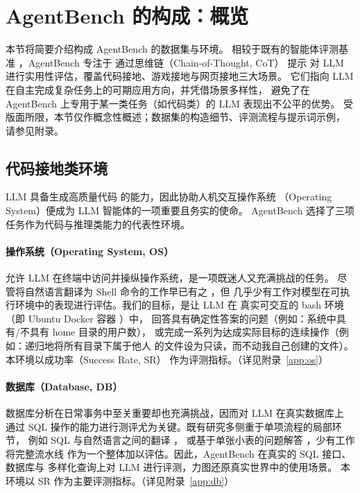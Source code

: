 
\section{AgentBench 的构成：概览}

本节将简要介绍构成 AgentBench 的数据集与环境。
相较于既有的智能体评测基准 \citep{cote2019,fan2022}，AgentBench 专注于
通过思维链（Chain-of-Thought, CoT）\citep{wei2022b,yao2023b} 提示
对 LLM 进行实用性评估，覆盖代码接地、游戏接地与网页接地三大场景。
它们指向 LLM 在自主完成复杂任务上的可期应用方向，并凭借场景多样性，
避免了在 AgentBench 上专用于某一类任务（如代码类）的 LLM 表现出不公平的优势。
受版面所限，本节仅作概念性概述；数据集的构造细节、评测流程与提示词示例，
请参见附录。

\subsection{代码接地类环境}

LLM 具备生成高质量代码 \citep{chen2021} 的能力，因此协助人机交互操作系统
（Operating System）便成为 LLM 智能体的一项重要且务实的使命。
AgentBench 选择了三项任务作为代码与推理类能力的代表性环境。

\paragraph{操作系统（Operating System, OS）}
允许 LLM 在终端中访问并操纵操作系统，是一项既迷人又充满挑战的任务。
尽管将自然语言翻译为 Shell 命令的工作早已有之 \citep{lin2018}，但
几乎少有工作对模型在可执行环境中的表现进行评估。我们的目标，是让 LLM 在
真实可交互的 bash 环境（即 Ubuntu Docker 容器 \citep{merkel2014}）中，
回答具有确定性答案的问题（例如：系统中具有/不具有 home 目录的用户数），
或完成一系列为达成实际目标的连续操作（例如：递归地将所有目录下属于他人
的文件设为只读，而不动我自己创建的文件）。本环境以成功率（Success Rate, SR）
作为评测指标。（详见附录~\ref{app:os}）

\paragraph{数据库（Database, DB）}
数据库分析在日常事务中至关重要却也充满挑战，因而对 LLM 在真实数据库上
通过 SQL 操作的能力进行测评尤为关键。既有研究多侧重于单项流程的局部环节，
例如 SQL 与自然语言之间的翻译 \citep{zhong2017,gao2023,pourreza2023,ruan2023}，
或基于单张小表的问题解答 \citep{nan2021,iyyer2017}，少有工作将完整流水线
作为一个整体加以评估。因此，AgentBench 在真实的 SQL 接口、数据库与
多样化查询上对 LLM 进行评测，力图还原真实世界中的使用场景。
本环境以 SR 作为主要评测指标。（详见附录~\ref{app:db}）

